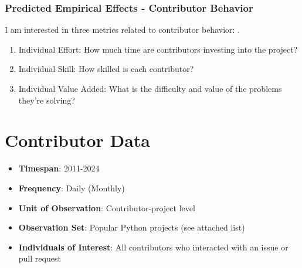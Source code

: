 \documentclass[12pt,notitlepage]{article}
\begin{document}
\subsubsection{Predicted Empirical Effects - Contributor Behavior}
I am interested in three metrics related to contributor behavior: . 
\begin{enumerate}
    \item Individual Effort: How much time are contributors investing into the project?
    \item Individual Skill: How skilled is each contributor? 
    \item Individual Value Added: What is the difficulty and value of the problems they're solving?
\end{enumerate}
\fi

\section{Contributor Data} \label{contributor_data}
\begin{itemize}
    \item \textbf{Timespan}: 2011-2024
    \item \textbf{Frequency}: Daily (Monthly)
    \item \textbf{Unit of Observation}: Contributor-project level
    \item \textbf{Observation Set}: Popular Python projects (see attached list)
    \item \textbf{Individuals of Interest}: All contributors who interacted with an issue or pull request
\end{itemize}
\end{document}
